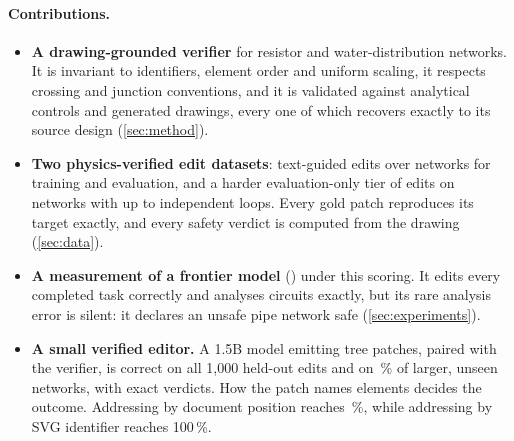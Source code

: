 \paragraph{Contributions.}
\begin{itemize}
\item \textbf{A drawing-grounded verifier} for resistor and water-distribution networks. It is invariant to
      identifiers, element order and uniform scaling, it respects crossing and junction conventions, and it is
      validated against \numControls{} analytical controls and \roundTripTotal{} generated drawings, every one of
      which recovers exactly to its source design (\cref{sec:method}).
\item \textbf{Two physics-verified edit datasets}: \netEdits{} text-guided edits over \netDesigns{} networks
      for training and evaluation, and a harder evaluation-only tier of \hardEdits{} edits on networks with up to
      \hardMaxLoopsDC{} independent loops. Every gold patch reproduces its target exactly, and every safety
      verdict is computed from the drawing (\cref{sec:data}).
\item \textbf{A measurement of a frontier model} (\astra) under this scoring. It edits every completed task
      correctly and analyses circuits exactly, but its rare analysis error is silent: it declares an unsafe pipe
      network safe (\cref{sec:experiments}).
\item \textbf{A small verified editor.} A 1.5B model emitting tree patches, paired with the verifier, is correct on all
      1{,}000 held-out edits and on \editOneFiveHard\,\% of larger, unseen networks, with exact verdicts. How the patch
      names elements decides the outcome. Addressing by document position reaches \editOneFivePosMain\,\%, while
      addressing by SVG identifier reaches 100\,\%.
\end{itemize}
